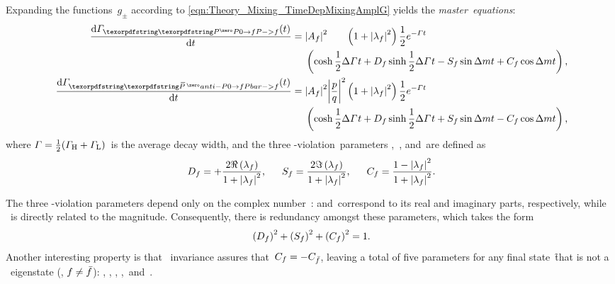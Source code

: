 %
Expanding the functions~\(g_{\pm}\) according to \cref{eqn:Theory_Mixing_TimeDepMixingAmplG} yields the \emph{master~equations}:
%
\begin{subequations} \label{eqn:theory_MasterEquations}
    \begin{align}
        \begin{split}
            \dfrac{\deriv\Gamma_{\PzF}(t)} {\deriv t} ={} & \abs{\Af}^{2} \hphantom{\abs{\dfrac{p}{q}}^{2}} \left(1 + \abs{\lf}^{2}\right) \dfrac{1}{2} e^{-\Gamma t} \\
                & \left(\cosh \frac{1}{2} \DG t + \Dpar \sinh \frac{1}{2} \DG t - \Spar \sin \dm t + \Cpar \cos \dm t \right) \rlap{,}
        \end{split} \\
        \begin{split}
            \dfrac{\deriv\Gamma_{\PzbF}(t)}{\deriv t} ={} & \abs{\Af}^{2}           \abs{\dfrac{p}{q}}^{2}  \left(1 + \abs{\lf}^{2}\right) \dfrac{1}{2} e^{-\Gamma t} \\
                & \left(\cosh \frac{1}{2} \DG t + \Dpar \sinh \frac{1}{2} \DG t + \Spar \sin \dm t - \Cpar \cos \dm t \right) \rlap{,}
        \end{split}
    \end{align}
\end{subequations}
%
where \({\Gamma = \frac{1}{2} ({\Gamma_{\text{H}}} + {\Gamma_{\text{L}}})}\)~is the average decay width, and the three \CP-violation~parameters \Dpar,~\Cpar, and~\Spar are defined as
%
\begin{equation} \label{eqn:theory_CPParams}
    \begin{alignedat}{3}
        \Dpar = \Dparsign\dfrac{2\Re\left(\lf\right)}{1 + \abs{\lf}^{2}} \rlap{,} \qquad \Spar = \dfrac{2\Im\left(\lf\right)}{1 + \abs{\lf}^{2}} \rlap{,} \qquad \Cpar = \dfrac{1 - \abs{\lf}^{2}}{1 + \abs{\lf}^{2}} \rlap{.}
    \end{alignedat}
\end{equation}

The three \CP-violation parameters depend only on the complex number~\lf: \Dpar and~\Spar correspond to its real and imaginary parts, respectively, while \Cpar~is directly related to the magnitude.
Consequently, there is redundancy amongst these parameters, which takes the form
%
\begin{equation}
    \left(\Dpar\right)^{2} + \left(\Spar\right)^{2} + \left(\Cpar\right)^{2} = 1 \rlap{.}
\end{equation}
%
Another interesting property is that \CPT~invariance assures that~\({C_{f} = -C_{\bar{f}}}\), leaving a total of five parameters for any final state~\f that is not a \CP~eigenstate (\ie, \({f \neq \bar{f}}\)): \Dpar, \Dbpar, \Spar, \Sbpar,~and~\Cpar.

